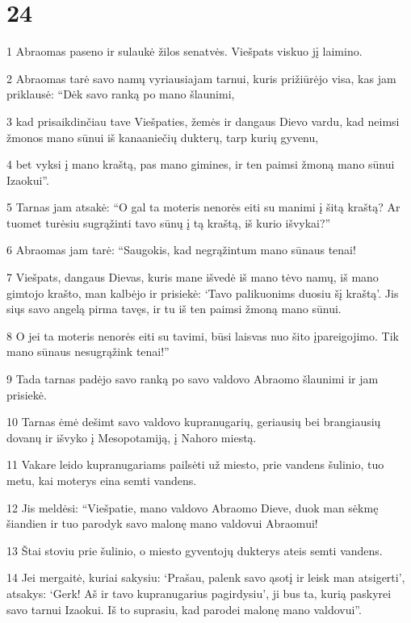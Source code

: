 \chapter{24}


\par 1 Abraomas paseno ir sulaukė žilos senatvės. Viešpats viskuo jį laimino. 
\par 2 Abraomas tarė savo namų vyriausiajam tarnui, kuris prižiūrėjo visa, kas jam priklausė: “Dėk savo ranką po mano šlaunimi, 
\par 3 kad prisaikdinčiau tave Viešpaties, žemės ir dangaus Dievo vardu, kad neimsi žmonos mano sūnui iš kanaaniečių dukterų, tarp kurių gyvenu, 
\par 4 bet vyksi į mano kraštą, pas mano gimines, ir ten paimsi žmoną mano sūnui Izaokui”. 
\par 5 Tarnas jam atsakė: “O gal ta moteris nenorės eiti su manimi į šitą kraštą? Ar tuomet turėsiu sugrąžinti tavo sūnų į tą kraštą, iš kurio išvykai?” 
\par 6 Abraomas jam tarė: “Saugokis, kad negrąžintum mano sūnaus tenai! 
\par 7 Viešpats, dangaus Dievas, kuris mane išvedė iš mano tėvo namų, iš mano gimtojo krašto, man kalbėjo ir prisiekė: ‘Tavo palikuonims duosiu šį kraštą’. Jis siųs savo angelą pirma tavęs, ir tu iš ten paimsi žmoną mano sūnui. 
\par 8 O jei ta moteris nenorės eiti su tavimi, būsi laisvas nuo šito įpareigojimo. Tik mano sūnaus nesugrąžink tenai!” 
\par 9 Tada tarnas padėjo savo ranką po savo valdovo Abraomo šlaunimi ir jam prisiekė. 
\par 10 Tarnas ėmė dešimt savo valdovo kupranugarių, geriausių bei brangiausių dovanų ir išvyko į Mesopotamiją, į Nahoro miestą. 
\par 11 Vakare leido kupranugariams pailsėti už miesto, prie vandens šulinio, tuo metu, kai moterys eina semti vandens. 
\par 12 Jis meldėsi: “Viešpatie, mano valdovo Abraomo Dieve, duok man sėkmę šiandien ir tuo parodyk savo malonę mano valdovui Abraomui! 
\par 13 Štai stoviu prie šulinio, o miesto gyventojų dukterys ateis semti vandens. 
\par 14 Jei mergaitė, kuriai sakysiu: ‘Prašau, palenk savo ąsotį ir leisk man atsigerti’, atsakys: ‘Gerk! Aš ir tavo kupranugarius pagirdysiu’, ji bus ta, kurią paskyrei savo tarnui Izaokui. Iš to suprasiu, kad parodei malonę mano valdovui”. 
